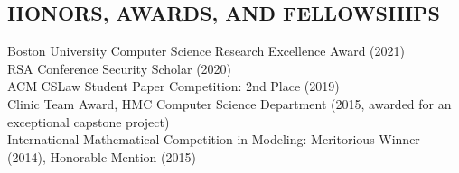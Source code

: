 \documentclass{res}
\begin{document}
\begin{resume}
\section{HONORS, AWARDS, AND FELLOWSHIPS}
\vspace{0.1in}
    Boston University Computer Science Research Excellence Award (2021) \\
    RSA Conference Security Scholar (2020) \\
    ACM CSLaw Student Paper Competition: 2nd Place (2019) \\
    Clinic Team Award, HMC Computer Science Department (2015, awarded for an exceptional capstone project) \\
    International Mathematical Competition in Modeling: Meritorious Winner (2014), Honorable Mention (2015) \\       


\end{resume}
\end{document}

